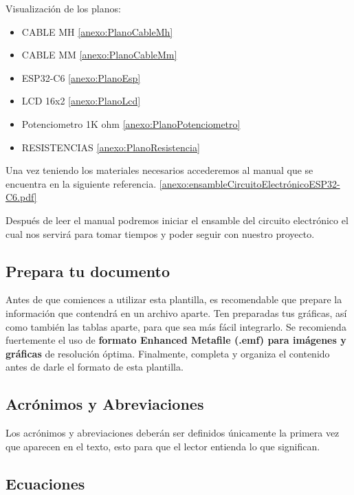          Visualización de los planos:
    \begin{itemize}
        \item CABLE MH \ref{anexo:PlanoCableMh}
        \item CABLE MM \ref{anexo:PlanoCableMm}
        \item ESP32-C6 \ref{anexo:PlanoEsp}
        \item LCD 16x2 \ref{anexo:PlanoLcd}
        \item Potenciometro 1K ohm \ref{anexo:PlanoPotenciometro}
        \item RESISTENCIAS \ref{anexo:PlanoResistencia}
    \end{itemize}
    
        Una vez teniendo los materiales necesarios accederemos al manual que se encuentra en la siguiente referencia.
        \ref{anexo:ensambleCircuitoElectrónicoESP32-C6.pdf}
    
        Después de leer el manual podremos iniciar el ensamble del circuito electrónico el cual nos servirá para tomar tiempos y poder seguir con nuestro proyecto. 
    
    \subsection{Prepara tu documento}
    
    Antes de que comiences a utilizar esta plantilla, es recomendable que prepare la información que contendrá en un archivo aparte. 
    Ten preparadas tus gráficas, así como también las tablas aparte, para que sea más fácil integrarlo. 
    Se recomienda fuertemente el uso de \textbf{formato Enhanced Metafile (.emf) para imágenes y gráficas} de resolución óptima. 
    Finalmente, completa y organiza el contenido antes de darle el formato de esta plantilla. 
    
    \subsection{Acrónimos y Abreviaciones}
    
    Los acrónimos y abreviaciones deberán ser definidos únicamente la primera vez que aparecen en el texto, esto para que el lector entienda lo que significan.
    
    \subsection{Ecuaciones}
    
